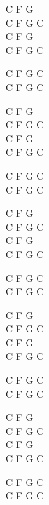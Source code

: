 \begin{chord}
    C F G\\
    C F G C\\
    C F G\\
    C F G C

    C F G C\\
    C F G C

    C F G\\
    C F G C\\
    C F G\\
    C F G C
    
    C F G C\\
    C F G C

    C F G\\
    C F G C\\
    C F G\\
    C F G C

    C F G C\\
    C F G C

    C F G\\
    C F G C\\
    C F G\\
    C F G C

    C F G C\\
    C F G C

    C F G\\
    C F G C\\
    C F G\\
    C F G C

    C F G C\\
    C F G C
\end{chord}